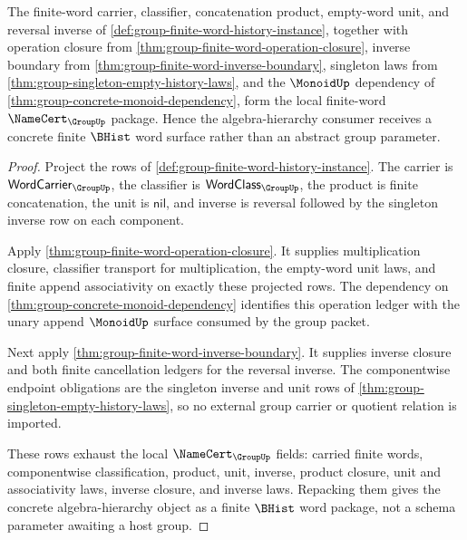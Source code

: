 \begin{theorem}
\label{thm:group-finite-word-namecert-package}
The finite-word carrier, classifier, concatenation product, empty-word unit,
and reversal inverse of \autoref{def:group-finite-word-history-instance},
together with operation closure from
\autoref{thm:group-finite-word-operation-closure}, inverse boundary from
\autoref{thm:group-finite-word-inverse-boundary}, singleton laws from
\autoref{thm:group-singleton-empty-history-laws}, and the $\MonoidUp$
dependency of \autoref{thm:group-concrete-monoid-dependency}, form the local
finite-word $\NameCert_{\GroupUp}$ package. Hence the algebra-hierarchy
consumer receives a concrete finite $\BHist$ word surface rather than an
abstract group parameter.
\end{theorem}
\begin{proof}
Project the rows of \autoref{def:group-finite-word-history-instance}. The
carrier is $\mathsf{WordCarrier}_{\GroupUp}$, the classifier is
$\mathsf{WordClass}_{\GroupUp}$, the product is finite concatenation, the unit
is $\mathsf{nil}$, and inverse is reversal followed by the singleton inverse
row on each component.

Apply \autoref{thm:group-finite-word-operation-closure}. It supplies
multiplication closure, classifier transport for multiplication, the empty-word
unit laws, and finite append associativity on exactly these projected rows.
The dependency on \autoref{thm:group-concrete-monoid-dependency} identifies
this operation ledger with the unary append $\MonoidUp$ surface consumed by
the group packet.

Next apply \autoref{thm:group-finite-word-inverse-boundary}. It supplies
inverse closure and both finite cancellation ledgers for the reversal inverse.
The componentwise endpoint obligations are the singleton inverse and unit rows
of \autoref{thm:group-singleton-empty-history-laws}, so no external group
carrier or quotient relation is imported.

These rows exhaust the local $\NameCert_{\GroupUp}$ fields: carried finite
words, componentwise classification, product, unit, inverse, product closure,
unit and associativity laws, inverse closure, and inverse laws. Repacking them
gives the concrete algebra-hierarchy object as a finite $\BHist$ word package,
not a schema parameter awaiting a host group.
\end{proof}
